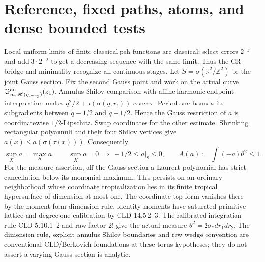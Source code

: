 \documentclass[11pt]{article}
\newcommand{\R}{\mathbb R}
\begin{document}
\section{Reference, fixed paths, atoms, and dense bounded tests}
Local uniform limits of finite classical psh functions are classical:
select errors $2^{-j}$ and add $3\cdot2^{-j}$ to get a decreasing
sequence with the same limit. Thus the GR bridge and minimality recognize
all continuous stages. Let $S=\sigma(\R^2/\mathbb Z^2)$ be the joint
Gauss section. Fix the second Gauss point and work on the actual curve
$\mathbb G_{m,\mathscr H(\eta_{e^{-r_2}})}^{\rm an}(z_1)$.
Annulus Shilov comparison with affine harmonic endpoint interpolation
makes $q^2/2+a(\sigma(q,r_2))$ convex. Period one bounds its subgradients
between $q-1/2$ and $q+1/2$. Hence the Gauss restriction of $a$ is
coordinatewise $1/2$-Lipschitz. Swap coordinates for the other estimate.
Shrinking rectangular polyannuli and their four Shilov vertices give
$a(x)\le a(\sigma(\tau(x)))$. Consequently
\begin{equation}\label{reference}
 \sup_Xa=\max_Sa,\qquad \sup_Xa=0\ \Longrightarrow\
 -1/2\le a|_S\le0,\qquad A(a):=\int(-a)\theta^2\le1.
\end{equation}
For the measure assertion, off the Gauss section a Laurent polynomial
has strict cancellation below its monomial maximum. This persists on
an ordinary neighborhood whose coordinate tropicalization lies in its
finite tropical hypersurface of dimension at most one. The coordinate
top form vanishes there by the moment-form dimension rule. Identity
moments have saturated primitive lattice and degree-one calibration by
CLD 14.5.2--3. The calibrated integration rule CLD 5.10.1--2 and raw
factor $2!$ give the actual measure $\theta^2=2\sigma_*dr_1dr_2$.
The dimension rule, explicit annulus Shilov boundaries and raw wedge
convention are conventional CLD/Berkovich foundations at these torus
hypotheses; they do not assert a varying Gauss section is analytic.
\end{document}

